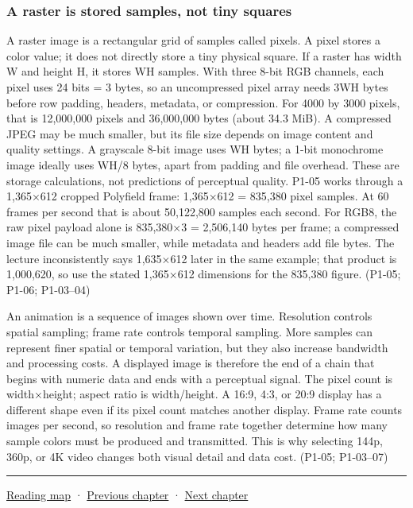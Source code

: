 \subsubsection{A raster is stored samples, not tiny squares}\label{03-visual-computing-i-ch003-a-raster-is-stored-samples-not-tiny-squares}

A raster image is a rectangular grid of samples called pixels. A pixel stores a color value; it does not directly store a tiny physical square. If a raster has width W and height H, it stores WH samples. With three 8-bit RGB channels, each pixel uses 24 bits = 3 bytes, so an uncompressed pixel array needs 3WH bytes before row padding, headers, metadata, or compression. For 4000 by 3000 pixels, that is 12,000,000 pixels and 36,000,000 bytes (about 34.3 MiB). A compressed JPEG may be much smaller, but its file size depends on image content and quality settings. A grayscale 8-bit image uses WH bytes; a 1-bit monochrome image ideally uses WH/8 bytes, apart from padding and file overhead. These are storage calculations, not predictions of perceptual quality. P1-05 works through a 1,365×612 cropped Polyfield frame: 1,365×612 = 835,380 pixel samples. At 60 frames per second that is about 50,122,800 samples each second. For RGB8, the raw pixel payload alone is 835,380×3 = 2,506,140 bytes per frame; a compressed image file can be much smaller, while metadata and headers add file bytes. The lecture inconsistently says 1,635×612 later in the same example; that product is 1,000,620, so use the stated 1,365×612 dimensions for the 835,380 figure. (P1-05; P1-06; P1-03--04)

An animation is a sequence of images shown over time. Resolution controls spatial sampling; frame rate controls temporal sampling. More samples can represent finer spatial or temporal variation, but they also increase bandwidth and processing costs. A displayed image is therefore the end of a chain that begins with numeric data and ends with a perceptual signal. The pixel count is width×height; aspect ratio is width/height. A 16:9, 4:3, or 20:9 display has a different shape even if its pixel count matches another display. Frame rate counts images per second, so resolution and frame rate together determine how many sample colors must be produced and transmitted. This is why selecting 144p, 360p, or 4K video changes both visual detail and data cost. (P1-05; P1-03--07)

\begin{center}\rule{0.5\linewidth}{0.5pt}\end{center}

\hyperref[volume-reading-map]{Reading map} · \hyperref[03-visual-computing-i-ch002]{Previous chapter} · \hyperref[03-visual-computing-i-ch004]{Next chapter}
